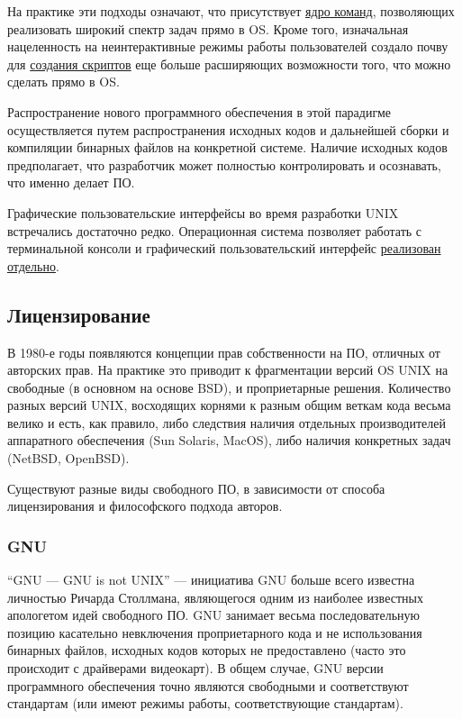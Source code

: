 На практике эти подходы означают, что присутствует \hyperref[sec:commands]{ядро команд}, позволяющих реализовать широкий спектр задач прямо в OS. Кроме того, изначальная нацеленность на неинтерактивные режимы работы пользователей создало почву для \hyperref[sec:shell_scripting]{создания скриптов} еще больше расширяющих возможности того, что можно сделать прямо в OS.

Распространение нового программного обеспечения в этой парадигме осуществляется путем распространения исходных кодов и дальнейшей сборки и компиляции бинарных файлов на конкретной системе. Наличие исходных кодов предполагает, что разработчик может полностью контролировать и осознавать, что именно делает ПО.

Графические пользовательские интерфейсы во время разработки UNIX встречались достаточно редко. Операционная система позволяет работать с терминальной консоли и графический пользовательский интерфейс \hyperref[sec:Xserver]{реализован отдельно}.

\subsection{Лицензирование}
В 1980-е годы появляются концепции прав собственности на ПО, отличных от авторских прав. На практике это приводит к фрагментации версий OS UNIX на свободные (в основном на основе BSD), и проприетарные решения. Количество разных версий UNIX, восходящих корнями к разным общим веткам кода весьма велико и есть, как правило, либо следствия наличия отдельных производителей аппаратного обеспечения (Sun Solaris, MacOS), либо наличия конкретных задач (NetBSD, OpenBSD).

Существуют разные виды свободного ПО, в зависимости от способа лицензирования и философского подхода авторов.

\subsubsection{GNU}
\enquote{GNU --- GNU is not UNIX} --- инициатива GNU больше всего известна личностью Ричарда Столлмана, являющегося одним из наиболее известных апологетом идей свободного ПО. GNU занимает весьма последовательную позицию касательно невключения проприетарного кода и не использования бинарных файлов, исходных кодов которых не предоставлено (часто это происходит с драйверами видеокарт). В общем случае, GNU версии программного обеспечения точно являются свободными и соответствуют стандартам (или имеют режимы работы, соответствующие стандартам).

